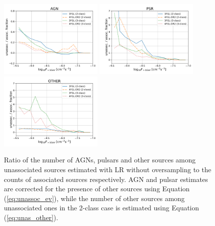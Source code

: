 \begin{figure}[h]
\center
\includegraphics[width=0.45\textwidth]{plots/N_logS_diff_AGN.pdf}
\includegraphics[width=0.45\textwidth]{plots/N_logS_diff_PSR.pdf}
\includegraphics[width=0.45\textwidth]{plots/N_logS_diff_OTHER.pdf}
\caption{Ratio of the number of AGNs, pulsars and other sources among unassociated sources estimated with LR without oversampling
to the counts of associated sources respectively.
AGN and pulsar estimates are corrected for the presence of other sources using Equation (\ref{eq:unassoc_ev}),
while the number of other sources among unassociated ones in the 2-class case is estimated using Equation (\ref{eq:unas_other}).
} 
\label{fig:unass_vs_ass_frac}
\end{figure}


